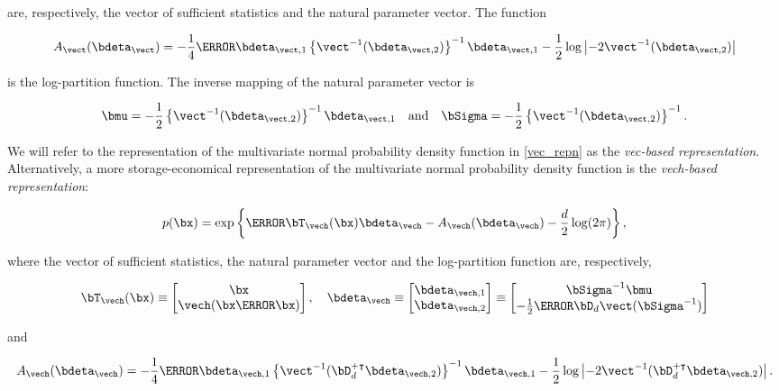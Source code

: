 \documentclass[12pt]{article}
\theoremstyle{plain}
\theoremstyle{definition}
\theoremstyle{remark}
\begin{document}
\noindent are, respectively, the vector of sufficient statistics and the natural parameter vector. The function

\[
	A_{\vect} (\bdeta_{\vect}) =
		-\frac14 \T{\bdeta}_{\vect, 1} \left\{ \vect^{-1} (\bdeta_{\vect, 2}) \right\}^{-1} \bdeta_{\vect, 1}
		- \frac12 \log \left| -2 \vect^{-1} (\bdeta_{\vect, 2}) \right|
\]

\noindent is the log-partition function. The inverse mapping of the natural parameter vector is
\cite[equation~S.4]{wand17}

\begin{equation}
	\bmu = -\frac12 \left\{ \vect^{-1} (\bdeta_{\vect, 2}) \right\}^{-1} \bdeta_{\vect, 1} \quad
	\text{and} \quad
	\bSigma = -\frac12 \left\{ \vect^{-1} (\bdeta_{\vect, 2}) \right\}^{-1}.
\label{gauss_vec_comm_params}
\end{equation}

\noindent We will refer to the representation of the multivariate normal probability density function in
\eqref{vec_repn} as the \emph{vec-based representation}. Alternatively, a more storage-economical
representation of the multivariate normal probability density function is the \emph{vech-based representation}:

\[
	p (\bx) = \exp \left\{ \T{\bT_{\vech} (\bx)} \bdeta_{\vech} - A_{\vech} (\bdeta_{\vech}) - \frac{d}{2} \log (2 \pi) \right\},
\]

\noindent where the vector of sufficient statistics, the natural parameter vector and the log-partition function are,
respectively,

\[
	\bT_{\vech} (\bx) \equiv \begin{bmatrix}
		\bx \\
		\vech (\bx \T{\bx})
	\end{bmatrix}, \quad
	\bdeta_{\vech} \equiv \begin{bmatrix}
		\bdeta_{\vech, 1} \\
		\bdeta_{\vech, 2}
	\end{bmatrix} \equiv \begin{bmatrix}
		\bSigma^{-1} \bmu \\
		-\frac12 \T{\bD_d} \vect(\bSigma^{-1})
	\end{bmatrix}
\]

\noindent and

\[
	A_{\vech} (\bdeta_{\vech}) =
		-\frac14 \T{\bdeta}_{\vech, 1} \left\{
			\vect^{-1} (\bD_d^{+ \intercal} \bdeta_{\vech, 2})
		\right\}^{-1} \bdeta_{\vech, 1}
		- \frac12 \log \left| -2 \vect^{-1} (\bD_d^{+ \intercal} \bdeta_{\vech, 2}) \right|.
\]
\end{document}
